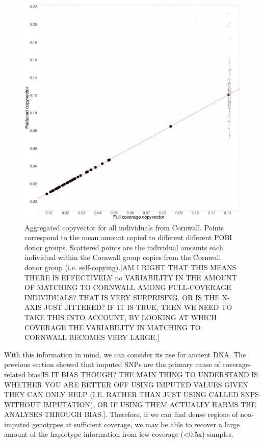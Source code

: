 \begin{figure}[htp]
    \centering
    \includegraphics[width=1.0\textwidth]{../images/chapter1/dense_sparse_devon_cornwall_collapsed_scatterpoints.pdf}
    \caption{Aggregated copyvector for all individuals from Cornwall. Points correspond to the mean amount copied to different different POBI donor groups. Scattered points are the individual amounts each individual within the Cornwall group copies from the Cornwall donor group (i.e. self-copying).{\color{red}[AM I RIGHT THAT THIS MEANS THERE IS EFFECTIVELY no VARIABILITY IN THE AMOUNT OF MATCHING TO CORNWALL AMONG FULL-COVERAGE INDIVIDUALS? THAT IS VERY SURPRISING. OR IS THE X-AXIS JUST JITTERED? IF IT IS TRUE, THEN WE NEED TO TAKE THIS INTO ACCOUNT, BY LOOKING AT WHICH COVERAGE THE VARIABILITY IN MATCHING TO CORNWALL BECOMES VERY LARGE.]}}
    \label{fig:dense_sparse_devon_cornwall_collapsed_scatterpoints}
\end{figure}

With this information in mind, we can consider its use for ancient DNA. The previous section showed that imputed SNPs are the primary cause of coverage-related bias{\color{red}[IS IT BIAS THOUGH? THE MAIN THING TO UNDERSTAND IS WHETHER YOU ARE BETTER OFF USING IMPUTED VALUES GIVEN THEY CAN ONLY HELP (I.E. RATHER THAN JUST USING CALLED SNPS WITHOUT IMPUTATION), OR IF USING THEM ACTUALLY HARMS THE ANALYSES THROUGH BIAS.]}. Therefore, if we can find dense regions of non-imputed genotypes at sufficient coverage, we may be able to recover a large amount of the haplotype information from low coverage (<0.5x) samples.


